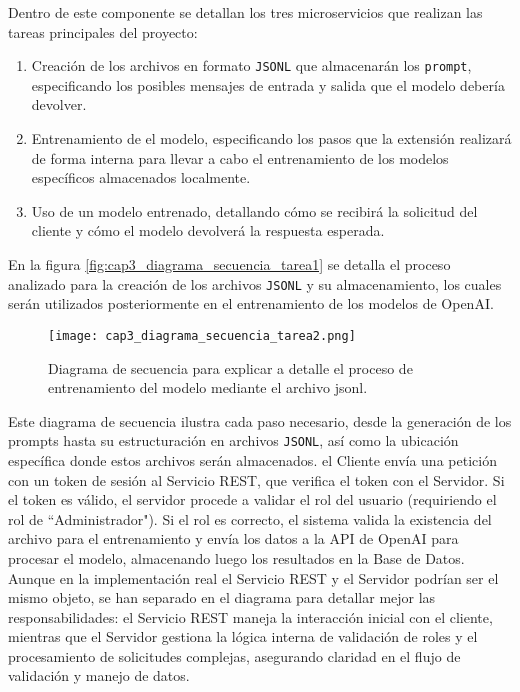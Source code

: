 \begin{itemize}
	Dentro de este componente se detallan los tres microservicios que realizan las tareas principales del proyecto:
	
	\begin{enumerate}
		\item Creación de los archivos en formato  \texttt{JSONL} que almacenarán los \texttt{prompt}, especificando los posibles mensajes de entrada y salida que el modelo debería devolver.
		\item Entrenamiento de el modelo, especificando los pasos que la extensión realizará de forma interna para llevar a cabo el entrenamiento de los modelos específicos almacenados localmente.
		\item 	Uso de un modelo entrenado, detallando cómo se recibirá la solicitud del cliente y cómo el modelo devolverá la respuesta esperada.
	\end{enumerate}
	
	En la figura \ref{fig:cap3_diagrama_secuencia_tarea1} se detalla el proceso analizado para la creación de los archivos \texttt{JSONL} y su almacenamiento, los cuales serán utilizados posteriormente en el entrenamiento de los modelos de OpenAI. 
	
		\begin{figure}[H]  
		\centering
		\texttt{[image: cap3\_diagrama\_secuencia\_tarea2.png]}
		\caption{Diagrama de secuencia para explicar a detalle el proceso de entrenamiento del modelo mediante el archivo jsonl.}
		\label{fig:cap3_diagrama_secuencia_tarea2}
	\end{figure}	
	
	Este diagrama de secuencia ilustra cada paso necesario, desde la generación de los prompts hasta su estructuración en archivos \texttt{JSONL}, así como la ubicación específica donde estos archivos serán almacenados. el Cliente envía una petición con un token de sesión al Servicio REST, que verifica el token con el Servidor. Si el token es válido, el servidor procede a validar el rol del usuario (requiriendo el rol de ``Administrador"). Si el rol es correcto, el sistema valida la existencia del archivo para el entrenamiento y envía los datos a la API de OpenAI para procesar el modelo, almacenando luego los resultados en la Base de Datos. Aunque en la implementación real el Servicio REST y el Servidor podrían ser el mismo objeto, se han separado en el diagrama para detallar mejor las responsabilidades: el Servicio REST maneja la interacción inicial con el cliente, mientras que el Servidor gestiona la lógica interna de validación de roles y el procesamiento de solicitudes complejas, asegurando claridad en el flujo de validación y manejo de datos.
	

\end{itemize}
